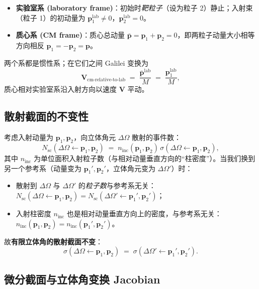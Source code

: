 \begin{itemize}
  \item \textbf{实验室系 (laboratory frame)}：初始时\emph{靶粒子}（设为粒子 2）静止；入射束（粒子 1）的初动量为 $\bm{p}_1^{\text{lab}}\neq 0$，$\bm{p}_2^{\text{lab}}=0$。
  \item \textbf{质心系 (CM frame)}：质心总动量 $\bar{\bm{p}}=\bm{p}_1+\bm{p}_2=0$，即两粒子动量大小相等方向相反 $\bm{p}_1=-\bm{p}_2=\bm{p}$。
\end{itemize}
两个系都是惯性系；在它们之间 Galilei 变换为
\begin{equation}
  \bm{V}_{\text{cm-relative-to-lab}} \;=\; \frac{\bar{\bm{p}}^{\text{lab}}}{M}
  \;=\; \frac{\bm{p}_1^{\text{lab}}}{M},
  \label{eq:lab-to-cm-velocity}
\end{equation}
质心相对实验室系沿入射方向以速度 $\bm{V}$ 平动。

\subsection{散射截面的不变性}

考虑入射动量为 $\bm{p}_1,\bm{p}_2$，向立体角元 $\Delta\Omega$ 散射的事件数：
\begin{equation}
  N_{\text{sc}}(\Delta\Omega \leftarrow \bm{p}_1,\bm{p}_2)
  \;=\; n_{\text{inc}}(\bm{p}_1,\bm{p}_2)\,\sigma(\Delta\Omega \leftarrow \bm{p}_1,\bm{p}_2),
  \label{eq:Nsc-2p}
\end{equation}
其中 $n_{\text{inc}}$ 为单位面积入射粒子数（与相对动量垂直方向的“柱密度”）。当我们换到另一个参考系（动量变为 $\bm{p}_1',\bm{p}_2'$，立体角元变为 $\Delta\Omega'$）时：
\begin{itemize}
  \item 散射到 $\Delta\Omega$ 与 $\Delta\Omega'$ 的\emph{粒子数}与参考系无关：$N_{\text{sc}}(\Delta\Omega\leftarrow\bm{p}_1,\bm{p}_2)=N_{\text{sc}}(\Delta\Omega'\leftarrow\bm{p}_1',\bm{p}_2')$；
  \item 入射柱密度 $n_{\text{inc}}$ 也是相对动量垂直方向上的密度，与参考系无关：$n_{\text{inc}}(\bm{p}_1,\bm{p}_2)=n_{\text{inc}}(\bm{p}_1',\bm{p}_2')$。
\end{itemize}
故\textbf{有限立体角的散射截面不变}：
\begin{equation}
  \sigma(\Delta\Omega \leftarrow \bm{p}_1,\bm{p}_2) \;=\; \sigma(\Delta\Omega' \leftarrow \bm{p}_1',\bm{p}_2').
  \label{eq:sigma-frame-invariant}
\end{equation}

\subsection{微分截面与立体角变换 Jacobian}

